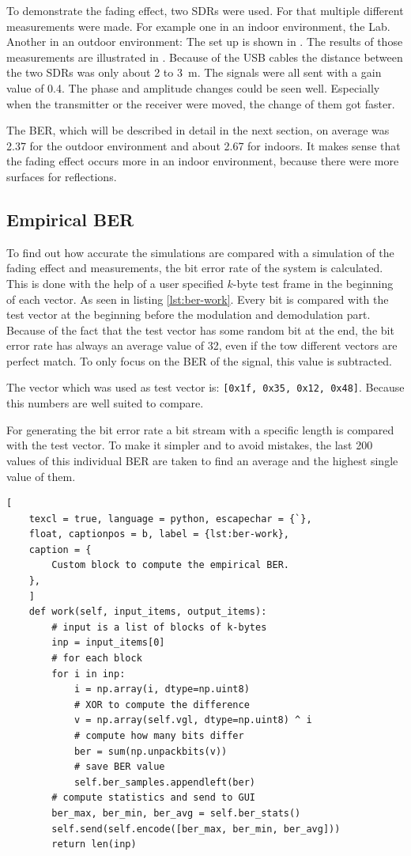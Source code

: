 To demonstrate the fading effect, two SDRs were used. For that multiple different measurements were made.
For example one in an indoor environment, the Lab. Another in an outdoor environment: The set up is shown in .
The results of those measurements are illustrated in . Because of the USB cables the distance between the two SDRs was only about \si{2} to \SI{3}{\meter}.
The signals were all sent with a gain value of 0.4. The phase and amplitude changes could be seen well. Especially when the transmitter or the receiver were moved, the change of them got faster.

The BER, which will be described in detail in the next section, on average was 2.37 for the outdoor environment and about 2.67 for indoors. It makes sense that the fading effect occurs more in an indoor environment, because there were more surfaces for reflections. 



\subsection{Empirical BER} \label{sec:ber}
To find out how accurate the simulations are compared with a simulation of the fading effect and measurements, the bit error rate of the system is calculated. This is done with the help of a user specified \(k\)-byte test frame in the beginning of each vector. As seen in listing \ref{lst:ber-work}. Every bit is compared with the test vector at the beginning before the modulation and demodulation part. 
Because of the fact that the test vector has some random bit at the end, the bit error rate has always an average value of 32, even if the tow different vectors are  perfect match. To only focus on the BER of the signal, this value is subtracted. 

The vector which was used as test vector is: \texttt{[0x1f, 0x35, 0x12, 0x48]}. Because this numbers are well suited to compare.%


For generating the bit error rate a bit stream with a specific length is compared with the test vector. To make it simpler and to avoid mistakes, the last 200 values of this individual BER are taken to find an average and the highest single value of them. 


\begin{lstlisting}[
	texcl = true, language = python, escapechar = {`},
	float, captionpos = b, label = {lst:ber-work},
	caption = {
		Custom block to compute the empirical BER.
	},
	]
	def work(self, input_items, output_items):
		# input is a list of blocks of k-bytes
		inp = input_items[0]
		# for each block
		for i in inp:
			i = np.array(i, dtype=np.uint8)
			# XOR to compute the difference
			v = np.array(self.vgl, dtype=np.uint8) ^ i
			# compute how many bits differ
			ber = sum(np.unpackbits(v))
			# save BER value
			self.ber_samples.appendleft(ber)
		# compute statistics and send to GUI
		ber_max, ber_min, ber_avg = self.ber_stats()
		self.send(self.encode([ber_max, ber_min, ber_avg]))
		return len(inp)
\end{lstlisting}

